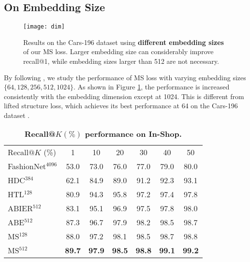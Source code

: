 \documentclass[10pt,twocolumn,letterpaper]{article}
\newcommand{\tablestyle}[2]{\setlength{\tabcolsep}{#1}\renewcommand{\arraystretch}{#2}\centering\footnotesize}
\begin{document}
\subsection{On Embedding Size}
\begin{figure}[htp]
	\vspace{-10pt}
	\centering
	\texttt{[image: dim]}
	\caption{Results on the Cars-196 dataset using \textbf{different embedding sizes} of our MS loss. Larger embedding size can considerably improve recall@1, while embedding sizes larger than 512 are not necessary.}
	\label{fig-embeding-size}
\end{figure} 
By following \cite{semi-hard}, we study the performance of MS loss with varying embedding sizes $\{64, 128, 256, 512, 1024\}$. As shown in Figure \ref{fig-embeding-size}, the performance is increased consistently with the embedding dimension except at  1024. This is different from lifted structure loss, which achieves its best performance at 64 on the Cars-196 dataset  \cite{lifted-structured-loss}. 

\begin{table}[t]
    \tablestyle{7.5pt}{1.1}
	\begin{center}
		\begin{tabular}{l|cccccc}
			Recall$@K$ (\%) & 1 & 10 & 20 & 30 & 40 & 50\\ \shline
			FashionNet$^{4096}$ \cite{DeepFashion}&53.0 & 73.0 & 76.0 & 77.0 & 79.0 & 80.0 \\
			HDC$^{384}$ \cite{struct-clustering}& 62.1 & 84.9 & 89.0 & 91.2 & 92.3 & 93.1\\	 
			HTL$^{128}$ \cite{HTL} & 80.9& 94.3& 95.8& 97.2& 97.4& 97.8\\\hline
			ABIER$^{512}$ \cite{bier}  & 83.1 & 95.1 & 96.9 & 97.5 & 97.8 & 98.0\\	
			ABE$^{512}$ \cite{Kim_2018_ECCV} & 87.3 & 96.7 & 97.9 & 98.2 & 98.5 & 98.7\\ 
			\hline
			{MS}$^{128}$  & 88.0& 97.2& 98.1& 98.5& 98.7& 98.8\\
			{MS}$^{512}$   &\bf89.7 &\bf97.9& \bf98.5& \bf98.8 & \bf99.1 & \bf99.2\\
		\end{tabular}
		\caption{\textbf{Recall@$K(\%)$ performance on In-Shop.}}
		\label{Shop-table}
		\vspace{-10pt}
	\end{center}
\end{table}
\end{document}
